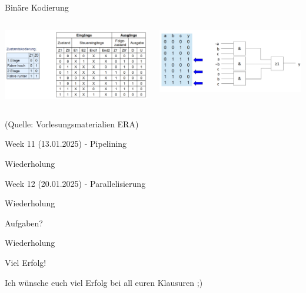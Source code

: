 \documentclass[
  german,            %
  aspectratio=169,    %
]{tumbeamer}
\begin{document}
\begin{frame}[c]{Binäre Kodierung}{}
  \begin{columns}[c]
		\begin{column}{0.5\textwidth}
      \begin{center}
        \includegraphics[width=\textwidth]{w09_bincode1_lv.png}
      \end{center}
    \end{column}
    \begin{column}{0.5\textwidth}
      \begin{center}
        \includegraphics[width=\textwidth]{w09_bincode2_lv.png}
      \end{center}
    \end{column}
  \end{columns}
  \vspace{0.5cm}
	\centering
	\tiny (Quelle: Vorlesungsmaterialien ERA)
\end{frame}

\begin{frame}[c]{Week 11 (13.01.2025) - Pipelining}{}
	\begin{center}
	  \LARGE Wiederholung
	\end{center}
\end{frame}

\begin{frame}[c]{Week 12 (20.01.2025) - Parallelisierung}{}
	\begin{center}
	  \LARGE Wiederholung
	\end{center}
\end{frame}

\begin{frame}[c]{Aufgaben?}{}
	\begin{center}
	  \LARGE Wiederholung
	\end{center}
\end{frame}

\begin{frame}[c]{Viel Erfolg!}{}
  \begin{center}
	\LARGE Ich wünsche euch viel Erfolg bei all euren Klausuren ;)
  \end{center}
\end{frame}
\end{document}
